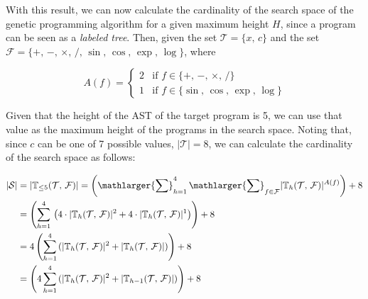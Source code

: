   With this result, we can now calculate the cardinality of the search space of
  the genetic programming algorithm for a given maximum height \(H\), since a
  program can be seen as a \emph{labeled tree}.
  Then, given the set \(\mathcal{T} = \{x,\, c\}\) and the set \(\mathcal{F} =
  \{+,\, -,\, \times,\, /,\, \sin,\, \cos,\, \exp,\, \log\}\), where 

  \[
    A(f) = \begin{cases}
      2 & \text{if } f \in \{+,\, -,\, \times,\, /\} \\
      1 & \text{if } f \in \{\sin,\, \cos,\, \exp,\, \log\}
    \end{cases}
  \]

  Given that the height of the AST of the target program is 5, we can use that
  value as the maximum height of the programs in the search space.
  Noting that, since \(c\) can be one of 7 possible values, \(|\mathcal{T}| = 
  8\), we can calculate the cardinality of the search space as follows:

  \begin{align*}
    |\mathcal{S}| 
      &= |\mathbb{T}_{\leq 5}(\mathcal{T},\, \mathcal{F})| 
        = \left(\mathlarger{\sum}_{h = 1}^{4}\,
          \mathlarger{\sum}_{f \in \mathcal{F}} 
          |\mathbb{T}_{h}(\mathcal{T},\, \mathcal{F})|^{A(f)}
        \right) + 8 \\
      &= \left(
          \sum_{h = 1}^{4}\, \left(
            4 \cdot |\mathbb{T}_{h}(\mathcal{T},\, \mathcal{F})|^{2} +
            4 \cdot |\mathbb{T}_{h}(\mathcal{T},\, \mathcal{F})|^{1}
          \right)
        \right) + 8 \\
      &= 4 \left(
          \sum_{h = 1}^{4}\, (
            |\mathbb{T}_{h}(\mathcal{T},\, \mathcal{F})|^{2} +
            |\mathbb{T}_{h}(\mathcal{T},\, \mathcal{F})|
          )
        \right) + 8 \\
      &= \left(
          4 \sum_{h = 1}^{4}\, (
            |\mathbb{T}_{h}(\mathcal{T},\, \mathcal{F})|^{2} +
            |\mathbb{T}_{h - 1}(\mathcal{T},\, \mathcal{F})|
          )
        \right) + 8 \\
  \end{align*}